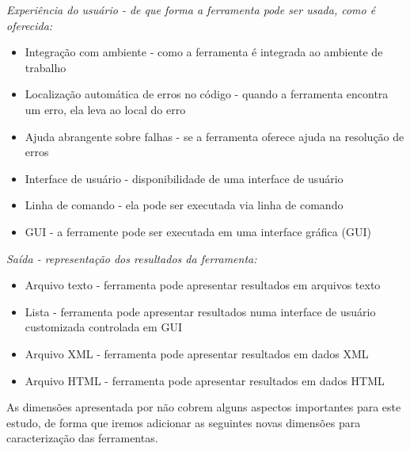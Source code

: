 \begin{description}
  \item {\it Experiência do usuário - de que forma a ferramenta pode ser usada, como é oferecida:}
    \begin{itemize}
      \item Integração com ambiente - como a ferramenta é integrada ao ambiente de trabalho
      \item Localização automática de erros no código - quando a ferramenta encontra um erro, ela leva ao local do erro
      \item Ajuda abrangente sobre falhas - se a ferramenta oferece ajuda na resolução de erros
      \item Interface de usuário - disponibilidade de uma interface de usuário
      \item Linha de comando - ela pode ser executada via linha de comando
      \item GUI - a ferramente pode ser executada em uma interface gráfica (GUI)
    \end{itemize}

  \item {\it Saída - representação dos resultados da ferramenta:}
    \begin{itemize}
      \item Arquivo texto - ferramenta pode apresentar resultados em arquivos texto
      \item Lista - ferramenta pode apresentar resultados numa interface de usuário customizada controlada em GUI
      \item Arquivo XML - ferramenta pode apresentar resultados em dados XML
      \item Arquivo HTML - ferramenta pode apresentar resultados em dados HTML
    \end{itemize}

\end{description}

As dimensões apresentada por  não cobrem alguns aspectos
importantes para este estudo, de forma que iremos adicionar as seguintes novas
dimensões para caracterização das ferramentas.

